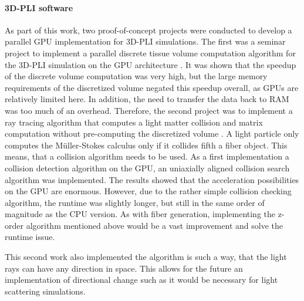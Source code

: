 \paragraph{\ac{3D-PLI} software}
% 
As part of this work, two proof-of-concept projects were conducted to develop a parallel GPU implementation for \ac{3D-PLI} simulations.
The first was a seminar project to implement a parallel discrete tissue volume computation algorithm for the \ac{3D-PLI} simulation on the \ac{GPU} architecture \cite{Kobusch:Seminar}.
It was shown that the speedup of the discrete volume computation was very high, but the large memory requirements of the discretized volume negated this speedup overall, as \acp{GPU} are relatively limited here.
In addition, the need to transfer the data back to \ac{RAM} was too much of an overhead.
Therefore, the second project was to implement a ray tracing algorithm that computes a light matter collision and matrix computation without pre-computing the discretized volume \cite{Kobusch:887783, GPUfastpli}.
A light particle only computes the M\"{u}ller-Stokes calculus only if it collides fifth a fiber object.
This means, that a collision algorithm needs to be used.
As a first implementation a collision detection algorithm on the \ac{GPU}, an uniaxially aligned collision search algorithm \cite{Karras2012} was implemented.
The results showed that the acceleration possibilities on the \ac{GPU} are enormous.
However, due to the rather simple collision checking algorithm, the runtime was slightly longer, but still in the same order of magnitude as the \ac{CPU} version.
As with fiber generation, implementing the z-order algorithm mentioned above \cite{Karras2012} would be a vast improvement and solve the runtime issue.
%
\par
This second work also implemented the algorithm is such a way, that the light rays can have any direction in space.
This allows for the future an implementation of directional change such as it would be necessary for light scattering simulations.
% 
% 
% 
